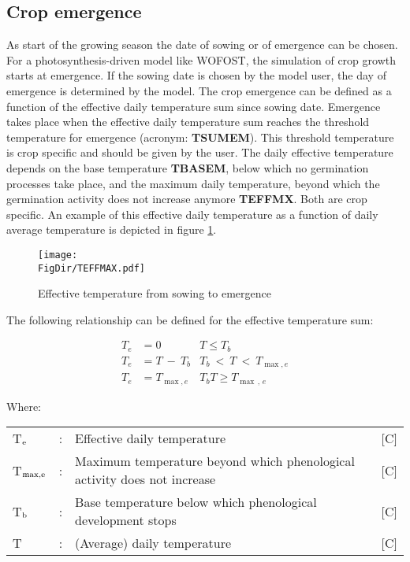 \subsection{Crop emergence}

As start of the growing season the date of sowing or of emergence can be chosen. For a
photosynthesis-driven model like WOFOST, the simulation of crop growth starts at
emergence. If the sowing date is chosen by the model user, the day of emergence is
determined by the model. The crop emergence can be
defined as a function of the effective daily temperature sum since sowing date. Emergence
takes place when the effective daily temperature sum reaches the threshold temperature
for emergence (acronym: {\bf TSUMEM}). This threshold temperature is crop specific and
should be given by the user. The daily effective temperature depends on the base
temperature {\bf TBASEM}, below which no germination processes take place, and the maximum daily
temperature, beyond which the germination activity does not increase anymore {\bf TEFFMX}.
Both are crop specific. An example of this effective daily temperature as a function of daily
average temperature is depicted in figure \ref{fig:TEFFMAX}.

\begin{figure}[p]
	\centering
	\texttt{[image: \\FigDir/TEFFMAX.pdf]}
	\caption{Effective temperature from sowing to emergence} 
	\label{fig:TEFFMAX}
\end{figure}

The following relationship can be defined for the effective temperature sum:

\begin{align}
T_{e} &= 0            & T \le T _{b} \nonumber  \\
T_{e} &= T~-~ T _{b}  & T _{b} ~<~T ~ < ~T _{\max ,e} \nonumber  \\
T_{e} &= T _{\max ,e} & T _{b} T \ge  T _{\max \, ,\, e}
\end{align}

Where:\\[5pt]
\begin{tabularx}{\textwidth}{llXr}
	T$_{{\rm e}}$ &:& Effective daily temperature & 
	[\degrees C]\\
	T$_{{\rm max,e}}$ &:& Maximum temperature beyond which phenological 
	activity does not increase    &    [\degrees C]\\
	T$_{{\rm b}}$ &:& Base temperature below which phenological development stops & 
	[\degrees C]\\
	T  &:& (Average) daily temperature & [\degrees C]
\end{tabularx}

